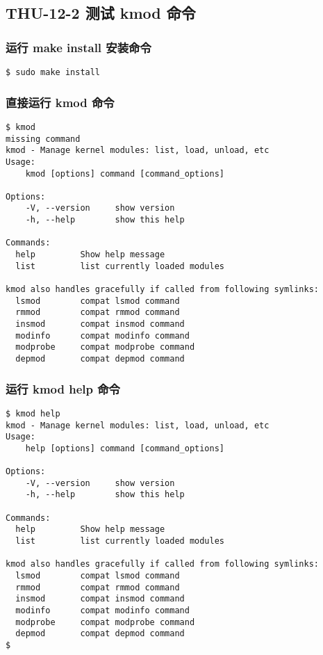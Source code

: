 \documentclass[11pt,a4paper]{article}
\begin{document}
\subsection{THU-12-2 测试 kmod 命令}

\subsubsection{运行 make install 安装命令}

{\begin{shaded}\begin{verbatim}
$ sudo make install
\end{verbatim}\end{shaded}}
\subsubsection{直接运行 kmod 命令}

{\begin{shaded}\begin{verbatim}
$ kmod
missing command
kmod - Manage kernel modules: list, load, unload, etc
Usage:
    kmod [options] command [command_options]

Options:
    -V, --version     show version
    -h, --help        show this help

Commands:
  help         Show help message
  list         list currently loaded modules

kmod also handles gracefully if called from following symlinks:
  lsmod        compat lsmod command
  rmmod        compat rmmod command
  insmod       compat insmod command
  modinfo      compat modinfo command
  modprobe     compat modprobe command
  depmod       compat depmod command
\end{verbatim}\end{shaded}}
\subsubsection{运行 kmod help 命令}

{\begin{shaded}\begin{verbatim}
$ kmod help
kmod - Manage kernel modules: list, load, unload, etc
Usage:
    help [options] command [command_options]

Options:
    -V, --version     show version
    -h, --help        show this help

Commands:
  help         Show help message
  list         list currently loaded modules

kmod also handles gracefully if called from following symlinks:
  lsmod        compat lsmod command
  rmmod        compat rmmod command
  insmod       compat insmod command
  modinfo      compat modinfo command
  modprobe     compat modprobe command
  depmod       compat depmod command
$ 
\end{verbatim}\end{shaded}}
\end{document}
